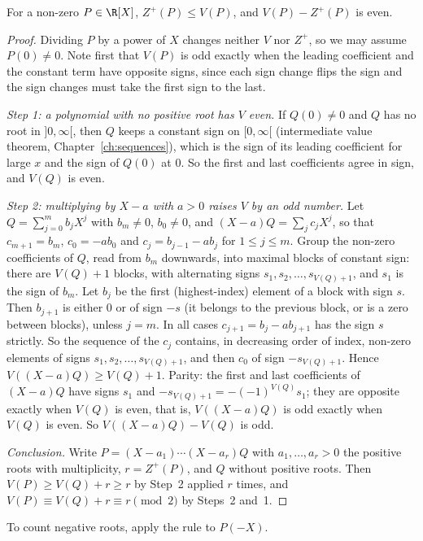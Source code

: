 \begin{theorem}\label{thm:descartes}
For a non-zero $P\in\R[X]$, $Z^+(P)\le V(P)$, and $V(P)-Z^+(P)$ is even.
\end{theorem}
\begin{proof}
Dividing $P$ by a power of $X$ changes neither $V$ nor $Z^+$, so we may assume $P(0)\ne0$. Note first that $V(P)$ is odd exactly when the leading
coefficient and the constant term have opposite signs, since each sign change flips the sign and the sign changes must take the first sign to the last.

\emph{Step 1: a polynomial with no positive root has $V$ even.} If $Q(0)\ne0$ and $Q$ has no root in $]0,\infty[$, then $Q$ keeps a constant sign on
$[0,\infty[$ (intermediate value theorem, Chapter~\ref{ch:sequences}), which is the sign of its leading coefficient for large $x$ and the sign of $Q(0)$ at $0$. So the
first and last coefficients agree in sign, and $V(Q)$ is even.

\emph{Step 2: multiplying by $X-a$ with $a>0$ raises $V$ by an odd number.} Let $Q=\sum_{j=0}^mb_jX^j$ with $b_m\ne0$, $b_0\ne0$, and
$(X-a)Q=\sum_jc_jX^j$, so that $c_{m+1}=b_m$, $c_0=-ab_0$ and $c_j=b_{j-1}-ab_j$ for $1\le j\le m$. Group the non-zero coefficients of $Q$, read from
$b_m$ downwards, into maximal blocks of constant sign: there are $V(Q)+1$ blocks, with alternating signs $s_1,s_2,\dots,s_{V(Q)+1}$, and $s_1$ is the
sign of $b_m$. Let $b_j$ be the first (highest-index) element of a block with sign $s$. Then $b_{j+1}$ is either $0$ or of sign $-s$ (it belongs to
the previous block, or is a zero between blocks), unless $j=m$. In all cases $c_{j+1}=b_j-ab_{j+1}$ has the sign $s$ strictly. So the sequence of the $c_j$
contains, in decreasing order of index, non-zero elements of signs $s_1,s_2,\dots,s_{V(Q)+1}$, and then $c_0$ of sign $-s_{V(Q)+1}$. Hence
$V((X-a)Q)\ge V(Q)+1$. Parity: the first and last coefficients of $(X-a)Q$ have signs $s_1$ and $-s_{V(Q)+1}=-(-1)^{V(Q)}s_1$; they are opposite exactly
when $V(Q)$ is even, that is, $V((X-a)Q)$ is odd exactly when $V(Q)$ is even. So $V((X-a)Q)-V(Q)$ is odd.

\emph{Conclusion.} Write $P=(X-a_1)\cdots(X-a_r)Q$ with $a_1,\dots,a_r>0$ the positive roots with multiplicity, $r=Z^+(P)$, and $Q$ without positive
roots. Then $V(P)\ge V(Q)+r\ge r$ by Step~2 applied $r$ times, and $V(P)\equiv V(Q)+r\equiv r\pmod2$ by Steps~2 and~1.
\end{proof}

To count negative roots, apply the rule to $P(-X)$.

